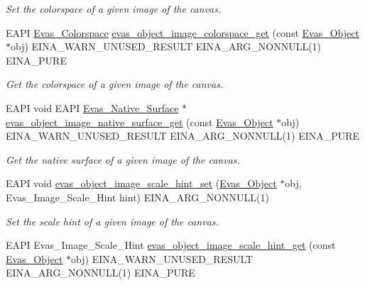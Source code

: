 \begin{DoxyCompactItemize}
\begin{DoxyCompactList}\small\item\em Set the colorspace of a given image of the canvas. \item\end{DoxyCompactList}\item 
EAPI \hyperlink{group__Evas__Object__Image_ga8c6e60db9c8b83b155ccea52957ff656}{Evas\_\-Colorspace} \hyperlink{group__Evas__Object__Image_gaa59339b6adb32081383fa5540641eb42}{evas\_\-object\_\-image\_\-colorspace\_\-get} (const \hyperlink{group__Evas__Object__Group_ga9e19e6dd1f517a0ba437c0114d3e7c97}{Evas\_\-Object} $\ast$obj) EINA\_\-WARN\_\-UNUSED\_\-RESULT EINA\_\-ARG\_\-NONNULL(1) EINA\_\-PURE
\begin{DoxyCompactList}\small\item\em Get the colorspace of a given image of the canvas. \item\end{DoxyCompactList}\item 
EAPI void EAPI \hyperlink{Evas_8h_ae35ae0b7b909a9e956836b92d63b493d}{Evas\_\-Native\_\-Surface} $\ast$ \hyperlink{group__Evas__Object__Image_gabd3effabde6da00dfcac7cf0cfa22280}{evas\_\-object\_\-image\_\-native\_\-surface\_\-get} (const \hyperlink{group__Evas__Object__Group_ga9e19e6dd1f517a0ba437c0114d3e7c97}{Evas\_\-Object} $\ast$obj) EINA\_\-WARN\_\-UNUSED\_\-RESULT EINA\_\-ARG\_\-NONNULL(1) EINA\_\-PURE
\begin{DoxyCompactList}\small\item\em Get the native surface of a given image of the canvas. \item\end{DoxyCompactList}\item 
EAPI void \hyperlink{group__Evas__Object__Image_gad13d32b74c2cd82c95b85fa9640ae529}{evas\_\-object\_\-image\_\-scale\_\-hint\_\-set} (\hyperlink{group__Evas__Object__Group_ga9e19e6dd1f517a0ba437c0114d3e7c97}{Evas\_\-Object} $\ast$obj, Evas\_\-Image\_\-Scale\_\-Hint hint) EINA\_\-ARG\_\-NONNULL(1)
\begin{DoxyCompactList}\small\item\em Set the scale hint of a given image of the canvas. \item\end{DoxyCompactList}\item 
EAPI Evas\_\-Image\_\-Scale\_\-Hint \hyperlink{group__Evas__Object__Image_ga8cce0086819196768915e5f2c2ed0cb2}{evas\_\-object\_\-image\_\-scale\_\-hint\_\-get} (const \hyperlink{group__Evas__Object__Group_ga9e19e6dd1f517a0ba437c0114d3e7c97}{Evas\_\-Object} $\ast$obj) EINA\_\-WARN\_\-UNUSED\_\-RESULT EINA\_\-ARG\_\-NONNULL(1) EINA\_\-PURE

\end{DoxyCompactItemize}
